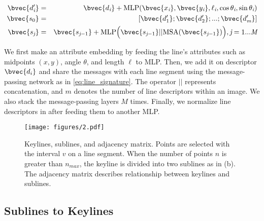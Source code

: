 \documentclass[letterpaper, 10 pt, journal, twoside]{ieeetran}
\begin{document}
\begin{eqnarray}
  \label{eq:line_signature}
  \bvec{d'_{\textit{i}}} &=& \bvec{d_{\textit{i}}} + \text{MLP}(\bvec{x_{\textit{i}}},\bvec{y_{\textit{i}}},\ell_{\textit{i}},\cos\theta_{\textit{i}},\sin\theta_{\textit{i}}) \\
  \bvec{s_0} &=& [\bvec{d'_1};\bvec{d'_2};...;\bvec{d'_{\textit{m}}}] \nonumber \\
  \bvec{s_{\textit{j}}} &=& \bvec{s_{\textit{j}-1}} + \text{MLP}\Big(\bvec{s_{\textit{j}-1}} || \text{MSA}(\bvec{s_{\textit{j}-1}})\Big), \textit{j} = 1...\textit{M} \nonumber
\end{eqnarray}


We first make an attribute embedding by feeding the line's attributes such as midpoints $(x,y)$, angle $\theta$, and length $\ell$ to \ac{MLP}. Then, we add it on descriptor $\bvec{d_i}$ and share the messages with each line segment using the message-passing network as in \eqref{eq:line_signature}. The operator $||$ represents concatenation, and $m$ denotes the number of line descriptors within an image. We also stack the message-passing layers $M$ times. Finally, we normalize line descriptors in  after feeding them to another \ac{MLP}.

\begin{figure}[!t]
	\centering
	\texttt{[image: figures/2.pdf]}
	\caption{Keylines, sublines, and adjacency matrix. Points are selected with the interval $v$ on a line segment. When the number of points $n$ is greater than $n_{max}$, the keyline is divided into two sublines as in (b). The adjacency matrix describes relationship between keylines and sublines.}
  \label{fig:adjacency_matrix}
	\vspace{-5mm}
\end{figure}


\subsection{Sublines to Keylines}
\end{document}
